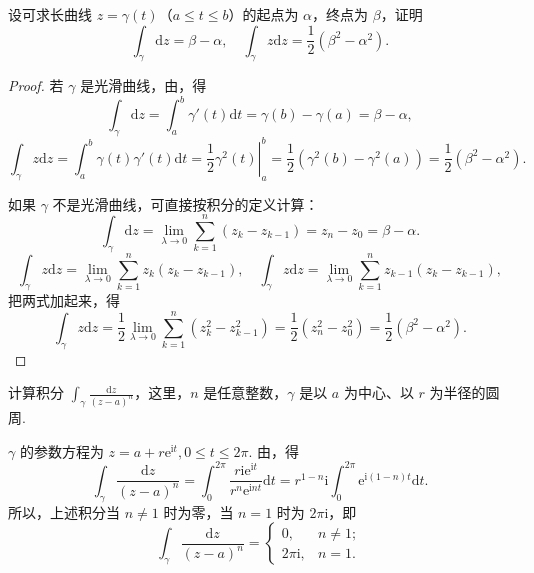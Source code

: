\documentclass[../../main.tex]{subfiles}
\begin{document}
\begin{example}\label{example:例3.1.3}
设可求长曲线 \( z = \gamma(t) \)（\( a \leqslant t \leqslant b \)）的起点为 \( \alpha \)，终点为 \( \beta \)，证明
\[
\int_\gamma \mathrm{d}z = \beta - \alpha,
\quad
\int_\gamma z \mathrm{d}z = \frac{1}{2}(\beta^2 - \alpha^2).
\]
\end{example}
\begin{proof}
若 \( \gamma \) 是光滑曲线，由，得
\[
\int_\gamma \mathrm{d}z = \int_a^b \gamma'(t)\mathrm{d}t
= \gamma(b) - \gamma(a)
= \beta - \alpha,
\]
\[
\int_\gamma z \mathrm{d}z = \int_a^b \gamma(t)\gamma'(t)\mathrm{d}t
= \left. \frac{1}{2}\gamma^2(t) \right|_a^b
= \frac{1}{2}(\gamma^2(b) - \gamma^2(a))
= \frac{1}{2}(\beta^2 - \alpha^2).
\]

如果 \( \gamma \) 不是光滑曲线，可直接按积分的定义计算：
\[
\int_\gamma \mathrm{d}z = \lim_{\lambda \to 0} \sum_{k = 1}^n (z_k - z_{k - 1})
= z_n - z_0
= \beta - \alpha.
\]
\[
\int_\gamma z \mathrm{d}z = \lim_{\lambda \to 0} \sum_{k = 1}^n z_k(z_k - z_{k - 1}),
\quad
\int_\gamma z \mathrm{d}z = \lim_{\lambda \to 0} \sum_{k = 1}^n z_{k - 1}(z_k - z_{k - 1}),
\]
把两式加起来，得
\[
\int_\gamma z \mathrm{d}z = \frac{1}{2} \lim_{\lambda \to 0} \sum_{k = 1}^n (z_k^2 - z_{k - 1}^2)
= \frac{1}{2}(z_n^2 - z_0^2)
= \frac{1}{2}(\beta^2 - \alpha^2).
\]
\end{proof}

\begin{example}\label{example:例3.1.4}
计算积分 \( \int_\gamma \frac{\mathrm{d}z}{(z - a)^n} \)，这里，\( n \) 是任意整数，\( \gamma \) 是以 \( a \) 为中心、以 \( r \) 为半径的圆周.
\end{example}
\begin{solution}
\( \gamma \) 的参数方程为 \( z = a + r\mathrm{e}^{\mathrm{i}t}, 0 \leqslant t \leqslant 2\pi \). 由，得
\[
\int_\gamma \frac{\mathrm{d}z}{(z - a)^n} = \int_0^{2\pi} \frac{r\mathrm{i}\mathrm{e}^{\mathrm{i}t}}{r^n\mathrm{e}^{\mathrm{i}nt}}\mathrm{d}t
= r^{1 - n}\mathrm{i} \int_0^{2\pi} \mathrm{e}^{\mathrm{i}(1 - n)t}\mathrm{d}t.
\]
所以，上述积分当 \( n \neq 1 \) 时为零，当 \( n = 1 \) 时为 \( 2\pi\mathrm{i} \)，即
\[
\int_\gamma \frac{\mathrm{d}z}{(z - a)^n} = 
\begin{cases} 
0, & n \neq 1; \\
2\pi\mathrm{i}, & n = 1.
\end{cases}
\]
\end{solution}
\end{document}
